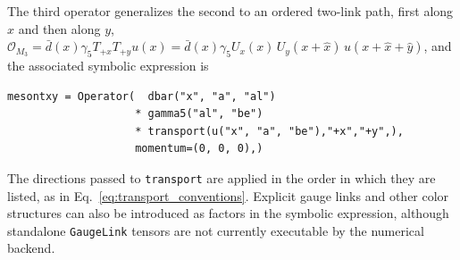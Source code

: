 \documentclass[a4paper,fleqn]{cas-dc}
\begin{document}
The third operator generalizes the second to an ordered two-link path, first along $x$ and then along $y$, $\mathcal{O}_{M_3}=\bar d(x)\gamma_5T_{+x}T_{+y}u(x)=\bar d(x)\gamma_5U_x(x)\,U_y(x+\hat x)\,u(x+\hat x+\hat y)$, and the associated symbolic expression is
\begin{verbatim}
mesontxy = Operator(  dbar("x", "a", "al")
                    * gamma5("al", "be")
                    * transport(u("x", "a", "be"),"+x","+y",),
                    momentum=(0, 0, 0),)
\end{verbatim}
\begin{center}
\end{center}
The directions passed to \texttt{transport} are applied in the order in which they are listed, as in Eq.~\eqref{eq:transport_conventions}. Explicit gauge links and other color structures can also be introduced as factors in the symbolic expression, although standalone \texttt{GaugeLink} tensors are not currently executable by the numerical backend.



\FloatBarrier
\end{document}
